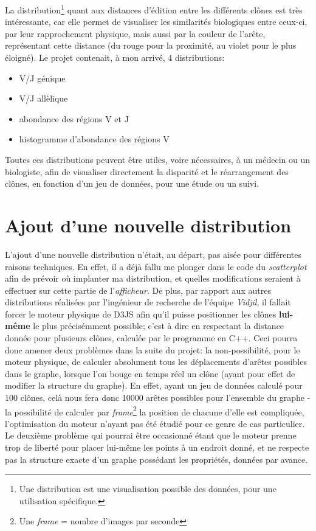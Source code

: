 \documentclass[12pt]{report}
\begin{document}
\begin{spacing}{1.2}
La distribution\footnote{Une distribution est une visualisation possible des données, pour une utilisation spécifique.} quant aux distances d'édition entre les différents clônes est très intéressante, car elle permet de visualiser les similarités biologiques entre ceux-ci, par leur rapprochement physique, mais aussi par la couleur de l'arête, représentant cette distance (du rouge pour la proximité, au violet pour le plus éloigné).
\newline
Le projet contenait, à mon arrivé, 4 distributions:
\begin{itemize}
\item V/J génique
\item V/J allèlique
\item abondance des régions V et J
\item histogramme d'abondance des régions V
\end{itemize}
Toutes ces distributions peuvent être utiles, voire nécessaires, à un médecin ou un biologiste, afin de visualiser directement la disparité et le réarrangement des clônes, en fonction d'un jeu de données, pour une étude ou un suivi.

\section{Ajout d'une nouvelle distribution}
L'ajout d'une nouvelle distribution n'était, au départ, pas aisée pour différentes raisons techniques.
\newline
En effet, il a déjà fallu me plonger dans le code du \textit{scatterplot} afin de prévoir où implanter ma distribution, et quelles modifications seraient à effectuer sur cette partie de l'\textit{afficheur}.
\newline
De plus, par rapport aux autres distributions réalisées par l'ingénieur de recherche de l'équipe \textit{Vidjil}, il fallait forcer le moteur physique de D3JS afin qu'il puisse positionner les clônes \textbf{lui-même} le plus précisémment possible; c'est à dire en respectant la distance donnée pour plusieurs clônes, calculée par le programme en C++.
\newline
Ceci pourra donc amener deux problèmes dans la suite du projet: la non-possibilité, pour le moteur physique, de calculer absolument tous les déplacements d'arêtes possibles dans le graphe, lorsque l'on bouge en temps réel un clône (ayant pour effet de modifier la structure du graphe). En effet, ayant un jeu de données calculé pour 100 clônes, celà nous fera donc 10000 arêtes possibles pour l'ensemble du graphe - la possibilité de calculer par \textit{frame}\footnote{Une \textit{frame} = nombre d'images par seconde} la position de chacune d'elle est compliquée, l'optimisation du moteur n'ayant pas été étudié pour ce genre de cas particulier. Le deuxième problème qui pourrai être occasionné étant que le moteur prenne trop de liberté pour placer lui-même les points à un endroit donné, et ne respecte pas la structure exacte d'un graphe possédant les propriétés, données par avance.


\end{spacing}
\end{document}
